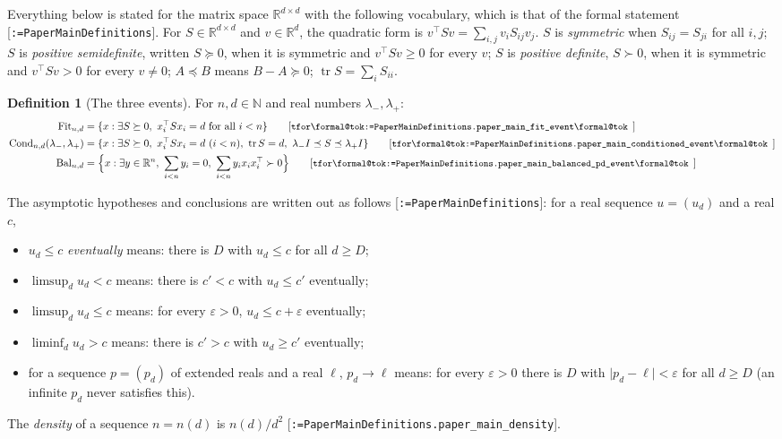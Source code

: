 \documentclass[11pt]{article}
\makeatletter
\newcommand{\formal@break}[1]{\@tfor\formal@tok:=#1\do{%
  \formal@tok
  \expandafter\ifx\formal@tok.\allowbreak\else
  \expandafter\ifx\formal@tok\_\allowbreak\fi\fi}}
\DeclareRobustCommand{\formal}[1]{\textnormal{[\texttt{\small\formal@break{#1}}]}}
\newcommand{\R}{\mathbb{R}}
\newcommand{\N}{\mathbb{N}}
\newcommand{\abs}[1]{\lvert #1\rvert}
\newcommand{\tr}{\operatorname{tr}}
\newcommand{\Id}{I}
\newcommand{\Fit}{\mathrm{Fit}}
\newcommand{\Cond}{\mathrm{Cond}}
\newcommand{\Bal}{\mathrm{Bal}}
\theoremstyle{plain}
\theoremstyle{definition}
\newtheorem{definition}[theorem]{Definition}
\makeatother
\begin{document}
Everything below is stated for the matrix space $\R^{d \times d}$ with the
following vocabulary, which is that of the formal statement
\formal{PaperMainDefinitions}. For $S \in \R^{d\times d}$ and
$v \in \R^d$, the quadratic form is $v^{\top} S v = \sum_{i, j} v_i S_{ij} v_j$.
$S$ is \emph{symmetric} when $S_{ij} = S_{ji}$ for all $i, j$; $S$ is
\emph{positive semidefinite}, written $S \succeq 0$, when it is symmetric
and $v^{\top} S v \ge 0$ for every $v$; $S$ is \emph{positive definite},
$S \succ 0$, when it is symmetric and $v^{\top} S v > 0$ for every
$v \ne 0$; $A \preceq B$ means $B - A \succeq 0$; $\tr S = \sum_i S_{ii}$.

\begin{definition}[The three events]\label{def:events}
For $n, d \in \N$ and real numbers $\lambda_-, \lambda_+$:
\begin{align*}
\Fit_{n,d} &= \{x : \exists S \succeq 0,\ x_i^{\top} S x_i = d \text{ for all } i < n\}
  \tag*{\formal{PaperMainDefinitions.paper\_main\_fit\_event}}\\
\Cond_{n,d}(\lambda_-, \lambda_+) &= \{x : \exists S \succeq 0,\ x_i^{\top} S x_i = d \ (i < n),\ \tr S = d,\ \lambda_- \Id \preceq S \preceq \lambda_+ \Id\}
  \tag*{\formal{PaperMainDefinitions.paper\_main\_conditioned\_event}}\\
\Bal_{n,d} &= \Bigl\{x : \exists y \in \R^n,\ \sum_{i<n} y_i = 0,\ \sum_{i<n} y_i x_i x_i^{\top} \succ 0\Bigr\}
  \tag*{\formal{PaperMainDefinitions.paper\_main\_balanced\_pd\_event}}
\end{align*}
\end{definition}

The asymptotic hypotheses and conclusions are written out as follows
\formal{PaperMainDefinitions}: for a real sequence $u = (u_d)$ and a real
$c$,
\begin{itemize}
\item $u_d \le c$ \emph{eventually} means: there is $D$ with $u_d \le c$ for all $d \ge D$;
\item $\limsup_d u_d < c$ means: there is $c' < c$ with $u_d \le c'$ eventually;
\item $\limsup_d u_d \le c$ means: for every $\varepsilon > 0$, $u_d \le c + \varepsilon$ eventually;
\item $\liminf_d u_d > c$ means: there is $c' > c$ with $u_d \ge c'$ eventually;
\item for a sequence $p = (p_d)$ of extended reals and a real $\ell$,
  $p_d \to \ell$ means: for every $\varepsilon > 0$ there is $D$ with
  $\abs{p_d - \ell} < \varepsilon$ for all $d \ge D$ (an infinite $p_d$ never
  satisfies this).
\end{itemize}
The \emph{density} of a sequence $n = n(d)$ is $n(d)/d^2$
\formal{PaperMainDefinitions.paper\_main\_density}.
\end{document}
